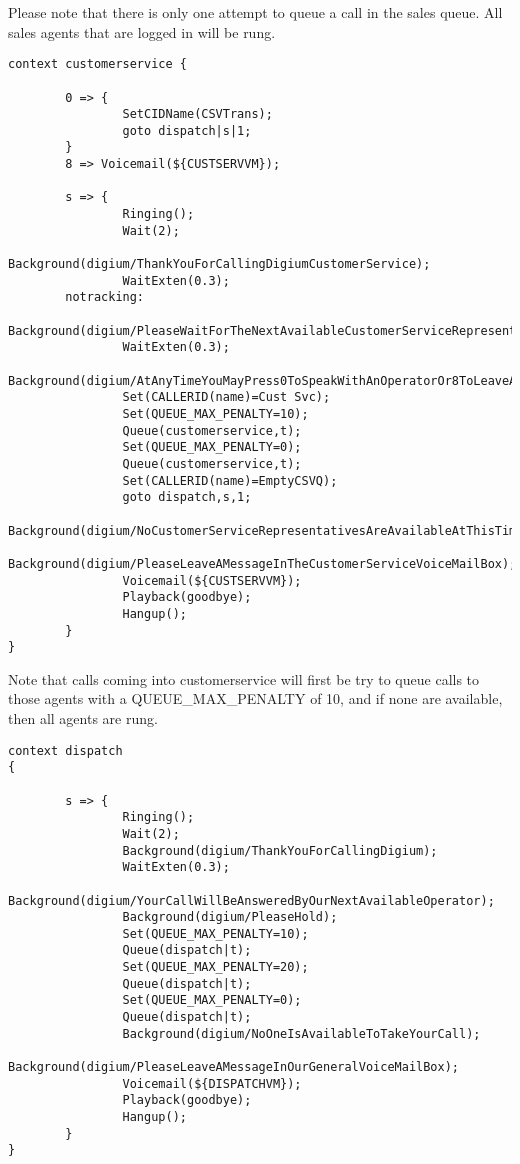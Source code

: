 Please note that there is only one attempt to queue a call in the sales queue. All sales agents that
are logged in will be rung.

\begin{astlisting}
\begin{verbatim}
context customerservice {

        0 => {
                SetCIDName(CSVTrans);
                goto dispatch|s|1;
        }
        8 => Voicemail(${CUSTSERVVM});

        s => {
                Ringing();
                Wait(2);
                Background(digium/ThankYouForCallingDigiumCustomerService);
                WaitExten(0.3);
        notracking:
                Background(digium/PleaseWaitForTheNextAvailableCustomerServiceRepresentative);
                WaitExten(0.3);
                Background(digium/AtAnyTimeYouMayPress0ToSpeakWithAnOperatorOr8ToLeaveAMessage);
                Set(CALLERID(name)=Cust Svc);
                Set(QUEUE_MAX_PENALTY=10);
                Queue(customerservice,t);
                Set(QUEUE_MAX_PENALTY=0);
                Queue(customerservice,t);
                Set(CALLERID(name)=EmptyCSVQ);
                goto dispatch,s,1;
                Background(digium/NoCustomerServiceRepresentativesAreAvailableAtThisTime);
                Background(digium/PleaseLeaveAMessageInTheCustomerServiceVoiceMailBox);
                Voicemail(${CUSTSERVVM});
                Playback(goodbye);
                Hangup();
        }
}
\end{verbatim}
\end{astlisting}

Note that calls coming into customerservice will first be try to queue
calls to those agents with a QUEUE\_MAX\_PENALTY of 10, and if none are available,
then all agents are rung.

\begin{astlisting}
\begin{verbatim}
context dispatch
{

        s => {
                Ringing();
                Wait(2);
                Background(digium/ThankYouForCallingDigium);
                WaitExten(0.3);
                Background(digium/YourCallWillBeAnsweredByOurNextAvailableOperator);
                Background(digium/PleaseHold);
                Set(QUEUE_MAX_PENALTY=10);
                Queue(dispatch|t);
                Set(QUEUE_MAX_PENALTY=20);
                Queue(dispatch|t);
                Set(QUEUE_MAX_PENALTY=0);
                Queue(dispatch|t);
                Background(digium/NoOneIsAvailableToTakeYourCall);
                Background(digium/PleaseLeaveAMessageInOurGeneralVoiceMailBox);
                Voicemail(${DISPATCHVM});
                Playback(goodbye);
                Hangup();
        }
}
\end{verbatim}
\end{astlisting}

